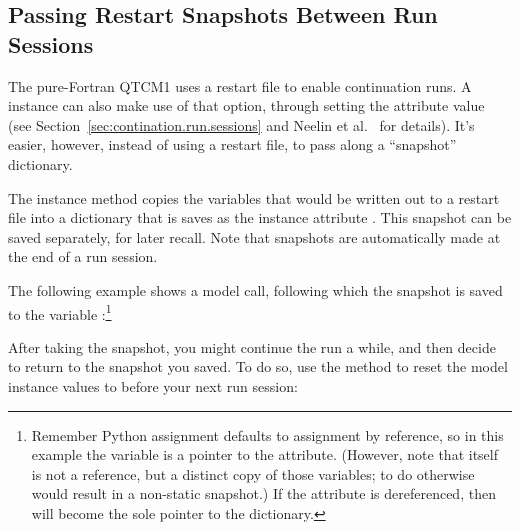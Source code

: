 	\subsection{Passing Restart Snapshots Between Run Sessions}
					\label{sec:snapshot.intro}

The pure-Fortran QTCM1 uses a restart file to enable continuation
runs.  A  instance can also make use of that option,
through setting the  attribute value
(see Section~\ref{sec:contination.run.sessions} and
Neelin et al.\ \cite{Neelin/etal:2002} for details).  
It's easier, however, instead of using a restart file, to pass 
along a ``snapshot'' dictionary.

The  instance method  copies the
variables that would be written out to a restart file into a
dictionary that is saves as the instance attribute .
This snapshot can be saved separately, for later recall.  Note that
snapshots are automatically made at the end of a run session.

The following example shows a model  call,
following which the snapshot is saved to the variable
:\footnote%
	{Remember Python assignment defaults to assignment by
	reference, so in this example the variable 
	is a pointer to the  attribute.
	(However, note that  itself is not a
	reference, but a distinct copy of those variables; to do
	otherwise would result in a non-static snapshot.)
	If the  attribute is dereferenced,
	then  will become the sole pointer to the
	dictionary.}

\begin{codeblock}
\end{codeblock}

After taking the snapshot, you might continue the run a while, and
then decide to return to the snapshot you saved.  To do so, use
the 
method to reset the model instance values to
 before your next run session:
\begin{codeblock}
\end{codeblock}

